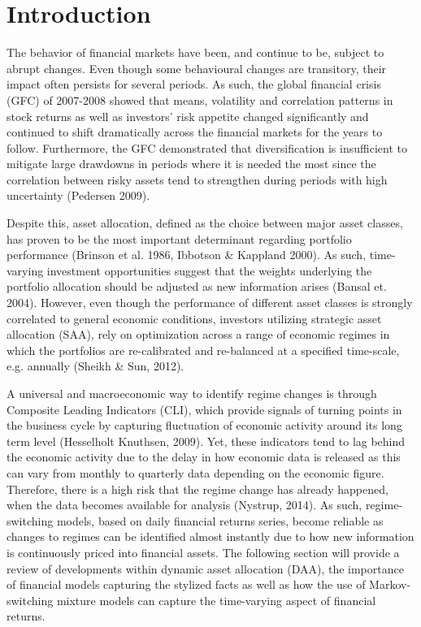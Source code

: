 \section{Introduction}
The behavior of financial markets have been, and continue to be, subject to abrupt changes. Even though some behavioural changes are transitory, their impact often persists for several periods. As such, the global financial crisis (GFC) of 2007-2008 showed that means, volatility and correlation patterns in stock returns as well as investors' risk appetite changed significantly and continued to shift dramatically across the financial markets for the years to follow. Furthermore, the GFC demonstrated that diversification is insufficient to mitigate large drawdowns in periods where it is needed the most since the correlation between risky assets tend to strengthen during periods with high uncertainty (Pedersen 2009). 

Despite this, asset allocation, defined as the choice between major asset classes, has proven to be the most important determinant regarding portfolio performance (Brinson et al. 1986, Ibbotson \& Kappland 2000). As such, time-varying investment opportunities suggest that the weights underlying the portfolio allocation should be adjusted as new information arises (Bansal et. 2004). However, even though the performance of different asset classes is strongly correlated to general economic conditions, investors utilizing strategic asset allocation (SAA), rely on optimization across a range of economic regimes in which the portfolios are re-calibrated and re-balanced at a specified time-scale, e.g. annually (Sheikh \& Sun, 2012).

A universal and macroeconomic way to identify regime changes is through Composite Leading Indicators (CLI), which provide signals of turning points in the business cycle by capturing fluctuation of economic activity around its long term level (Hesselholt Knuthsen, 2009). Yet, these indicators tend to lag behind the economic activity due to the delay in how economic data is released as this can vary from monthly to quarterly data depending on the economic figure. Therefore, there is a high risk that the regime change has already happened, when the data becomes available for analysis (Nystrup, 2014). As such, regime-switching models, based on daily financial returns series, become reliable as changes to regimes can be identified almost instantly due to how new information is continuously priced into financial assets. The following section will provide a review of developments within dynamic asset allocation (DAA), the importance of financial models capturing the stylized facts as well as how the use of Markov-switching mixture models can capture the time-varying aspect of financial returns. 


